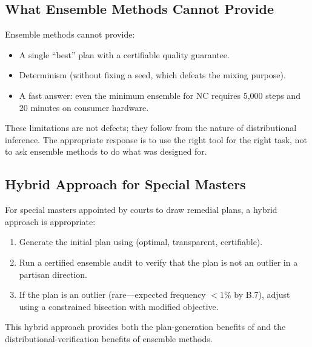 \subsection{What Ensemble Methods Cannot Provide}

Ensemble methods cannot provide:
\begin{itemize}
\item A single ``best'' plan with a certifiable quality guarantee.
\item Determinism (without fixing a seed, which defeats the mixing purpose).
\item A fast answer: even the minimum ensemble for NC requires 5{,}000 steps
      and 20 minutes on consumer hardware.
\end{itemize}

These limitations are not defects; they follow from the nature of
distributional inference.
The appropriate response is to use the right tool for the right task,
not to ask ensemble methods to do what \cs{} was designed for.

\subsection{Hybrid Approach for Special Masters}

For special masters appointed by courts to draw remedial plans, a hybrid
approach is appropriate:
\begin{enumerate}
\item Generate the initial plan using \cs{} (optimal, transparent,
      certifiable).
\item Run a certified ensemble audit to verify that the \cs{} plan is
      not an outlier in a partisan direction.
\item If the \cs{} plan is an outlier (rare---expected frequency $< 1\%$
      by B.7), adjust using a constrained bisection with modified objective.
\end{enumerate}

This hybrid approach provides both the plan-generation benefits of \cs{}
and the distributional-verification benefits of ensemble methods.
